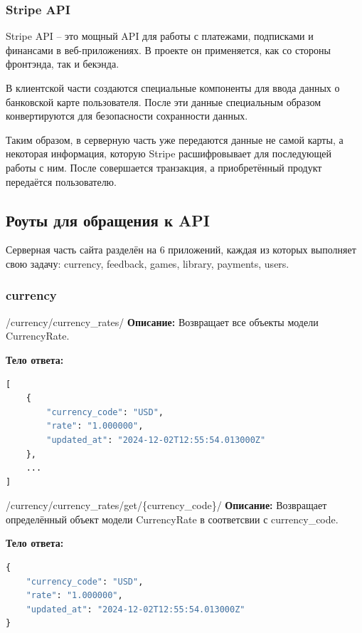 \documentclass[a4paper,14pt]{extarticle}
\begin{document}
	\subsubsection{Stripe API}
	Stripe API -- это мощный API для работы с платежами, подписками и финансами в веб-приложениях. В проекте он применяется, как со стороны фронтэнда, так и бекэнда. 
	
	В клиентской части создаются специальные компоненты для ввода данных о банковской карте пользователя. После эти данные специальным образом конвертируются для безопасности сохранности данных.
	
	Таким образом, в серверную часть уже передаются данные не самой карты, а некоторая информация, которую Stripe расшифровывает для последующей работы с ним. После совершается транзакция, а приобретённый продукт передаётся пользователю.
	
	\subsection{Роуты для обращения к API}
	Серверная часть сайта разделён на 6 приложений, каждая из которых выполняет свою задачу: currency, feedback, games, library, payments, users.
	
	\subsubsection{currency}
	\begin{getapi}{/currency/currency\_rates/}
		\textbf{Описание:} Возвращает все объекты модели CurrencyRate.\medskip
		
		\textbf{Тело ответа:}
		\begin{lstlisting}[language=Python]
[
    {
        "currency_code": "USD",
        "rate": "1.000000",
        "updated_at": "2024-12-02T12:55:54.013000Z"
    },
    ...
]
		\end{lstlisting}
	\end{getapi}
	
	\begin{getapi}{/currency/currency\_rates/get/\{currency\_code\}/}
		\textbf{Описание:} Возвращает определённый объект модели CurrencyRate в соответсвии с currency\_code.\medskip
		
		\textbf{Тело ответа:}
		\begin{lstlisting}[language=Python]
{
	"currency_code": "USD",
	"rate": "1.000000",
	"updated_at": "2024-12-02T12:55:54.013000Z"
}
		\end{lstlisting}
	\end{getapi}
	
\end{document}
